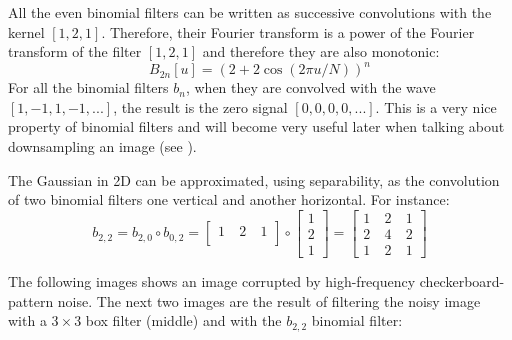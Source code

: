 All the even binomial filters can be written as successive convolutions with the kernel $\left[1,2,1\right]$. Therefore, their Fourier transform is a power of the Fourier transform of the filter $\left[1,2,1\right]$ and therefore they are also monotonic:
\begin{equation}
	B_{2n} \left[u\right] = (2+2 \cos (2 \pi u/N))^n
\end{equation}
For all the binomial filters $b_n$, when they are convolved with the wave $\left[1,-1,1,-1,...\right]$, the result is the zero signal $\left[0,0,0,0,...\right]$. This is a very nice property of binomial filters and will become very useful later when talking about downsampling an image (see \chap{\ref{chap:downsampling_and_upsampling}}).


The Gaussian in 2D can be approximated, using separability, as the convolution of two binomial filters one vertical and another horizontal. For instance:
\begin{equation}
	b_{2,2} = b_{2,0} \circ b_{0,2} =  \begin{bmatrix}
		1 ~ & 2 ~ & 1 \\
	\end{bmatrix}\circ \begin{bmatrix}
		1 \\
		2 \\
		1
	\end{bmatrix}=
	\begin{bmatrix}
		1 ~ & 2 ~ & 1 \\
		2 ~ & 4 ~ & 2 \\
		1~  & 2 ~ & 1
	\end{bmatrix}
\end{equation}


The following images shows an image corrupted by high-frequency checkerboard-pattern noise. The next two images are the result of filtering the noisy image with a $3\times3$ box filter (middle) and with the $b_{2,2}$ binomial filter:

